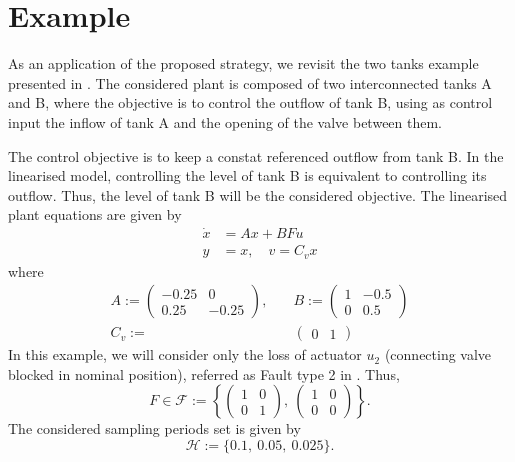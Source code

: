 \documentclass[letterpaper, 10 pt, conference]{ieeeconf}
\newcommand{\dfn}{:=}
\begin{document}
\section{Example}
\label{sec:example}
As an application of the proposed strategy, we revisit the two tanks
example presented in \cite{steffen_controlReconfigurations}. The
considered plant is composed of two interconnected tanks A and B,
where the objective is to control the outflow of tank B, using as
control input the inflow of tank A and the opening of the valve
between them.

The control objective is to keep a constat referenced outflow from
tank B. In the linearised model, controlling the level of tank B is
equivalent to controlling its outflow. Thus, the level of tank B will
be the considered objective. The linearised plant equations are given
by
\begin{align}
  \dot{x} &= Ax+BFu\\
  y &= x, \quad  v = C_vx
\end{align}
where 
\begin{align}
  A\dfn 
  \begin{pmatrix}
    -0.25 & 0\\0.25 & -0.25
  \end{pmatrix},\quad & B \dfn
  \begin{pmatrix}
    1 & -0.5\\0& 0.5
  \end{pmatrix}\\
  C_v \dfn&
  \begin{pmatrix}
    0 & 1
  \end{pmatrix}
\end{align}
In this example, we will consider only the loss of actuator $u_2$
(connecting valve blocked in nominal position), referred as Fault type
2 in \cite{steffen_controlReconfigurations}. Thus,
\begin{equation}
  F\in\mathcal{F} \dfn \left\{
  \begin{pmatrix}
    1 & 0\\ 0 & 1
  \end{pmatrix},\:   \begin{pmatrix}
    1 & 0\\ 0 & 0
  \end{pmatrix} \right\}.
\end{equation}
 The considered sampling periods set is given by
\begin{equation}
  \mathcal{H} \dfn \{ 0.1, \:0.05,\: 0.025\}.
\end{equation}
\end{document}
